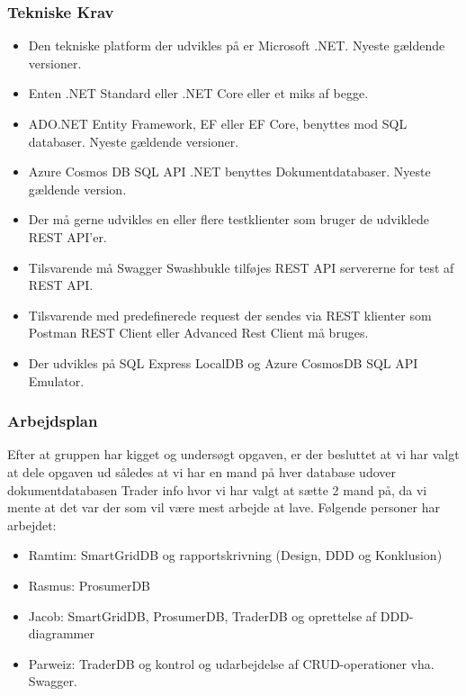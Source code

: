 \subsubsection{Tekniske Krav}

\begin{itemize}
    \item Den tekniske  platform der udvikles på er Microsoft .NET. Nyeste gældende versioner.
    \item Enten .NET Standard eller .NET Core eller et miks af begge. 
    \item ADO.NET Entity Framework, EF eller EF Core, benyttes mod SQL databaser. Nyeste gældende versioner.
    \item Azure Cosmos DB SQL API .NET benyttes Dokumentdatabaser. Nyeste gældende version.
    \item Der må gerne udvikles en eller flere testklienter som bruger de udviklede REST API'er.
    \item Tilsvarende må Swagger Swashbukle tilføjes REST API servererne for test af REST API.
    \item Tilsvarende med predefinerede request der sendes via REST klienter som Postman REST Client eller Advanced Rest Client må bruges.
    \item Der udvikles på SQL Express LocalDB og Azure CosmosDB SQL API Emulator.
\end{itemize}

\subsubsection{Arbejdsplan}

Efter at gruppen har kigget og undersøgt opgaven, er der besluttet at vi har valgt at dele opgaven ud således at vi har en mand på hver database udover dokumentdatabasen Trader info hvor vi har valgt at sætte 2 mand på, da vi mente at det var der som vil være mest arbejde at lave. Følgende personer har arbejdet:
\begin{itemize}
    \item Ramtim: SmartGridDB og rapportskrivning (Design, DDD og Konklusion)
    \item Rasmus: ProsumerDB 
    \item Jacob: SmartGridDB, ProsumerDB, TraderDB og oprettelse af DDD-diagrammer
    \item Parweiz: TraderDB og kontrol og udarbejdelse af CRUD-operationer vha. Swagger.
\end{itemize}


